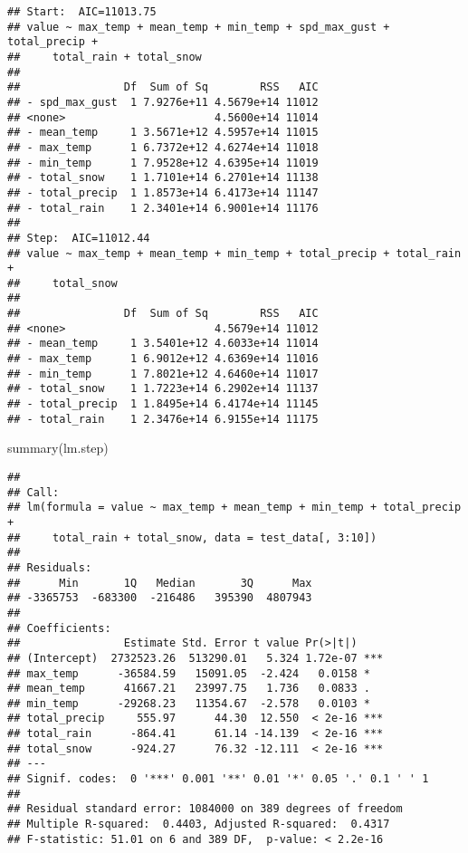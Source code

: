\documentclass[
]{article}
\newenvironment{Shaded}{\begin{snugshade}}{\end{snugshade}}
\newcommand{\FunctionTok}[1]{\textcolor[rgb]{0.00,0.00,0.00}{#1}}
\newcommand{\NormalTok}[1]{#1}
\begin{document}
\begin{verbatim}
## Start:  AIC=11013.75
## value ~ max_temp + mean_temp + min_temp + spd_max_gust + total_precip + 
##     total_rain + total_snow
## 
##                Df  Sum of Sq        RSS   AIC
## - spd_max_gust  1 7.9276e+11 4.5679e+14 11012
## <none>                       4.5600e+14 11014
## - mean_temp     1 3.5671e+12 4.5957e+14 11015
## - max_temp      1 6.7372e+12 4.6274e+14 11018
## - min_temp      1 7.9528e+12 4.6395e+14 11019
## - total_snow    1 1.7101e+14 6.2701e+14 11138
## - total_precip  1 1.8573e+14 6.4173e+14 11147
## - total_rain    1 2.3401e+14 6.9001e+14 11176
## 
## Step:  AIC=11012.44
## value ~ max_temp + mean_temp + min_temp + total_precip + total_rain + 
##     total_snow
## 
##                Df  Sum of Sq        RSS   AIC
## <none>                       4.5679e+14 11012
## - mean_temp     1 3.5401e+12 4.6033e+14 11014
## - max_temp      1 6.9012e+12 4.6369e+14 11016
## - min_temp      1 7.8021e+12 4.6460e+14 11017
## - total_snow    1 1.7223e+14 6.2902e+14 11137
## - total_precip  1 1.8495e+14 6.4174e+14 11145
## - total_rain    1 2.3476e+14 6.9155e+14 11175
\end{verbatim}

\begin{Shaded}
\begin{Highlighting}[]
\FunctionTok{summary}\NormalTok{(lm.step)}
\end{Highlighting}
\end{Shaded}

\begin{verbatim}
## 
## Call:
## lm(formula = value ~ max_temp + mean_temp + min_temp + total_precip + 
##     total_rain + total_snow, data = test_data[, 3:10])
## 
## Residuals:
##      Min       1Q   Median       3Q      Max 
## -3365753  -683300  -216486   395390  4807943 
## 
## Coefficients:
##                Estimate Std. Error t value Pr(>|t|)    
## (Intercept)  2732523.26  513290.01   5.324 1.72e-07 ***
## max_temp      -36584.59   15091.05  -2.424   0.0158 *  
## mean_temp      41667.21   23997.75   1.736   0.0833 .  
## min_temp      -29268.23   11354.67  -2.578   0.0103 *  
## total_precip     555.97      44.30  12.550  < 2e-16 ***
## total_rain      -864.41      61.14 -14.139  < 2e-16 ***
## total_snow      -924.27      76.32 -12.111  < 2e-16 ***
## ---
## Signif. codes:  0 '***' 0.001 '**' 0.01 '*' 0.05 '.' 0.1 ' ' 1
## 
## Residual standard error: 1084000 on 389 degrees of freedom
## Multiple R-squared:  0.4403, Adjusted R-squared:  0.4317 
## F-statistic: 51.01 on 6 and 389 DF,  p-value: < 2.2e-16
\end{verbatim}
\end{document}
